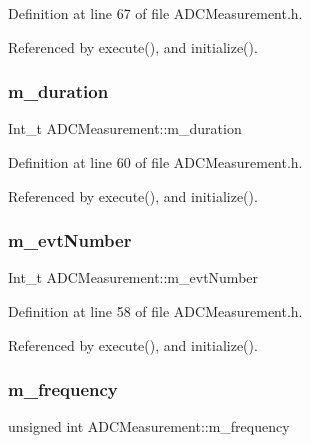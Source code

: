 Definition at line 67 of file A\+D\+C\+Measurement.\+h.



Referenced by execute(), and initialize().

\mbox{\label{classADCMeasurement_a92c0ee7d148bb63de876817f624d1527}} 
\subsubsection{\texorpdfstring{m\+\_\+duration}{m\_duration}}
{\footnotesize\ttfamily Int\+\_\+t A\+D\+C\+Measurement\+::m\+\_\+duration\hspace{0.3cm}{\ttfamily [private]}}



Definition at line 60 of file A\+D\+C\+Measurement.\+h.



Referenced by execute(), and initialize().

\mbox{\label{classADCMeasurement_ae21dcb1aeff71570c870648839a0c914}} 
\subsubsection{\texorpdfstring{m\+\_\+evt\+Number}{m\_evtNumber}}
{\footnotesize\ttfamily Int\+\_\+t A\+D\+C\+Measurement\+::m\+\_\+evt\+Number\hspace{0.3cm}{\ttfamily [private]}}



Definition at line 58 of file A\+D\+C\+Measurement.\+h.



Referenced by execute(), and initialize().

\mbox{\label{classADCMeasurement_ab4a0653cc015ddf9b33b877c1d43b260}} 
\subsubsection{\texorpdfstring{m\+\_\+frequency}{m\_frequency}}
{\footnotesize\ttfamily unsigned int A\+D\+C\+Measurement\+::m\+\_\+frequency\hspace{0.3cm}{\ttfamily [private]}}



